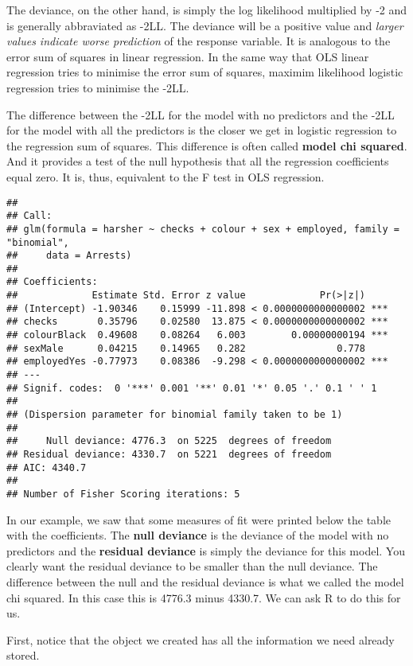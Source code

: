 \documentclass[
]{book}
\begin{document}
The deviance, on the other hand, is simply the log likelihood multiplied by -2 and is generally abbraviated as -2LL. The deviance will be a positive value and \emph{larger values indicate worse prediction} of the response variable. It is analogous to the error sum of squares in linear regression. In the same way that OLS linear regression tries to minimise the error sum of squares, maximim likelihood logistic regression tries to minimise the -2LL.

The difference between the -2LL for the model with no predictors and the -2LL for the model with all the predictors is the closer we get in logistic regression to the regression sum of squares. This difference is often called \textbf{model chi squared}. And it provides a test of the null hypothesis that all the regression coefficients equal zero. It is, thus, equivalent to the F test in OLS regression.

\begin{verbatim}
## 
## Call:
## glm(formula = harsher ~ checks + colour + sex + employed, family = "binomial", 
##     data = Arrests)
## 
## Coefficients:
##             Estimate Std. Error z value             Pr(>|z|)    
## (Intercept) -1.90346    0.15999 -11.898 < 0.0000000000000002 ***
## checks       0.35796    0.02580  13.875 < 0.0000000000000002 ***
## colourBlack  0.49608    0.08264   6.003        0.00000000194 ***
## sexMale      0.04215    0.14965   0.282                0.778    
## employedYes -0.77973    0.08386  -9.298 < 0.0000000000000002 ***
## ---
## Signif. codes:  0 '***' 0.001 '**' 0.01 '*' 0.05 '.' 0.1 ' ' 1
## 
## (Dispersion parameter for binomial family taken to be 1)
## 
##     Null deviance: 4776.3  on 5225  degrees of freedom
## Residual deviance: 4330.7  on 5221  degrees of freedom
## AIC: 4340.7
## 
## Number of Fisher Scoring iterations: 5
\end{verbatim}

In our example, we saw that some measures of fit were printed below the table with the coefficients. The \textbf{null deviance} is the deviance of the model with no predictors and the \textbf{residual deviance} is simply the deviance for this model. You clearly want the residual deviance to be smaller than the null deviance. The difference between the null and the residual deviance is what we called the model chi squared. In this case this is 4776.3 minus 4330.7. We can ask R to do this for us.

First, notice that the object we created has all the information we need already stored.
\end{document}
